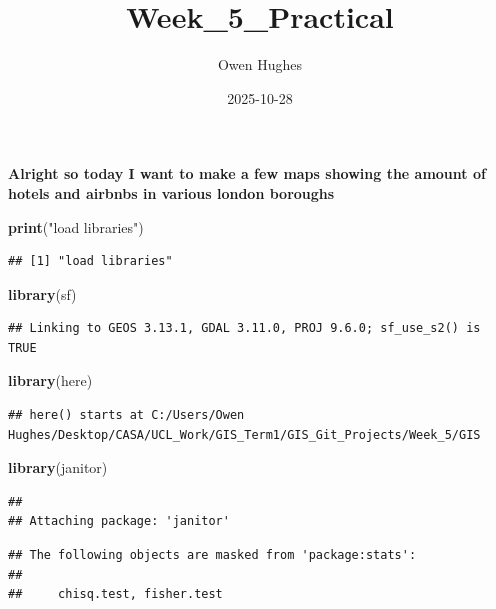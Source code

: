 \documentclass[
]{article}
\title{Week\_5\_Practical}
\author{Owen Hughes}
\date{2025-10-28}
\newenvironment{Shaded}{\begin{snugshade}}{\end{snugshade}}
\newcommand{\FunctionTok}[1]{\textcolor[rgb]{0.13,0.29,0.53}{\textbf{#1}}}
\newcommand{\NormalTok}[1]{#1}
\newcommand{\StringTok}[1]{\textcolor[rgb]{0.31,0.60,0.02}{#1}}
\begin{document}
\maketitle

\textbf{Alright so today I want to make a few maps showing the amount of
hotels and airbnbs in various london boroughs}

\begin{Shaded}
\begin{Highlighting}[]
\FunctionTok{print}\NormalTok{(}\StringTok{"load libraries"}\NormalTok{)}
\end{Highlighting}
\end{Shaded}

\begin{verbatim}
## [1] "load libraries"
\end{verbatim}

\begin{Shaded}
\begin{Highlighting}[]
\FunctionTok{library}\NormalTok{(sf)}
\end{Highlighting}
\end{Shaded}

\begin{verbatim}
## Linking to GEOS 3.13.1, GDAL 3.11.0, PROJ 9.6.0; sf_use_s2() is TRUE
\end{verbatim}

\begin{Shaded}
\begin{Highlighting}[]
\FunctionTok{library}\NormalTok{(here)}
\end{Highlighting}
\end{Shaded}

\begin{verbatim}
## here() starts at C:/Users/Owen Hughes/Desktop/CASA/UCL_Work/GIS_Term1/GIS_Git_Projects/Week_5/GIS
\end{verbatim}

\begin{Shaded}
\begin{Highlighting}[]
\FunctionTok{library}\NormalTok{(janitor)}
\end{Highlighting}
\end{Shaded}

\begin{verbatim}
## 
## Attaching package: 'janitor'
\end{verbatim}

\begin{verbatim}
## The following objects are masked from 'package:stats':
## 
##     chisq.test, fisher.test
\end{verbatim}
\end{document}
